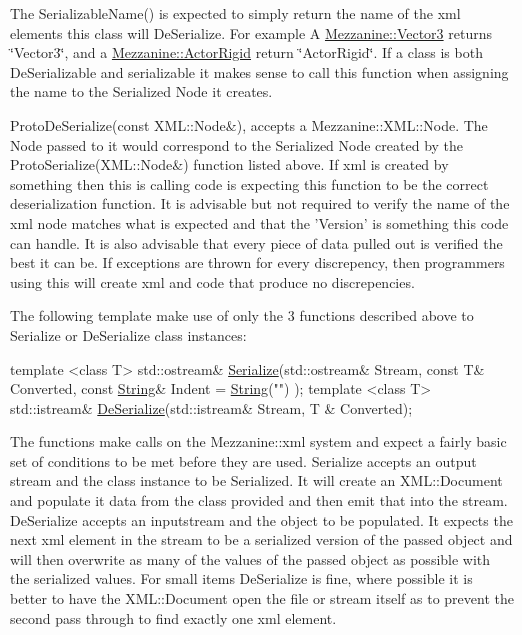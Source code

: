  The Serializable\-Name() is expected to simply return the name of the xml elements this class will De\-Serialize. For example A \hyperlink{classMezzanine_1_1Vector3}{Mezzanine\-::\-Vector3} returns \char`\"{}\-Vector3\char`\"{}, and a \hyperlink{classMezzanine_1_1ActorRigid}{Mezzanine\-::\-Actor\-Rigid} return \char`\"{}\-Actor\-Rigid\char`\"{}. If a class is both De\-Serializable and serializable it makes sense to call this function when assigning the name to the Serialized Node it creates. \par
 \par
 Proto\-De\-Serialize(const X\-M\-L\-::\-Node\&), accepts a Mezzanine\-::\-X\-M\-L\-::\-Node. The Node passed to it would correspond to the Serialized Node created by the Proto\-Serialize(\-X\-M\-L\-::\-Node\&) function listed above. If xml is created by something then this is calling code is expecting this function to be the correct deserialization function. It is advisable but not required to verify the name of the xml node matches what is expected and that the 'Version' is something this code can handle. It is also advisable that every piece of data pulled out is verified the best it can be. If exceptions are thrown for every discrepency, then programmers using this will create xml and code that produce no discrepencies. \par
 \par
 The following template make use of only the 3 functions described above to Serialize or De\-Serialize class instances\-: 
\begin{DoxyCode}
\textcolor{keyword}{template} <\textcolor{keyword}{class} T> std::ostream& \hyperlink{namespaceMezzanine_a9015c5e668e14b857a27888c56934148}{Serialize}(std::ostream& Stream, \textcolor{keyword}{const}
       T& Converted, \textcolor{keyword}{const} \hyperlink{namespaceMezzanine_acf9fcc130e6ebf08e3d8491aebcf1c86}{String}& Indent = \hyperlink{namespaceMezzanine_acf9fcc130e6ebf08e3d8491aebcf1c86}{String}(\textcolor{stringliteral}{""}) );
\textcolor{keyword}{template} <\textcolor{keyword}{class} T> std::istream& \hyperlink{namespaceMezzanine_ad8989ea81ccd1ad6d59a11921f0239a4}{DeSerialize}(std::istream& Stream, T
      & Converted);
\end{DoxyCode}
 The functions make calls on the Mezzanine\-::xml system and expect a fairly basic set of conditions to be met before they are used. Serialize accepts an output stream and the class instance to be Serialized. It will create an X\-M\-L\-::\-Document and populate it data from the class provided and then emit that into the stream. De\-Serialize accepts an inputstream and the object to be populated. It expects the next xml element in the stream to be a serialized version of the passed object and will then overwrite as many of the values of the passed object as possible with the serialized values. For small items De\-Serialize is fine, where possible it is better to have the X\-M\-L\-::\-Document open the file or stream itself as to prevent the second pass through to find exactly one xml element. \par
 \par
 

